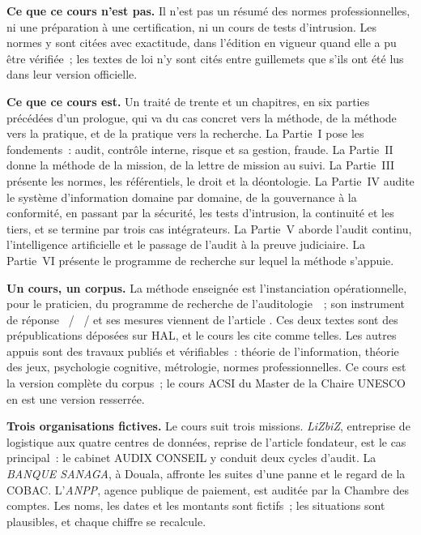 \textbf{Ce que ce cours n'est pas.} Il n'est pas un résumé des normes
professionnelles, ni une préparation à une certification, ni un cours de
tests d'intrusion. Les normes y sont citées avec exactitude, dans l'édition
en vigueur quand elle a pu être vérifiée~; les textes de loi n'y sont cités
entre guillemets que s'ils ont été lus dans leur version officielle.

\bigskip

\textbf{Ce que ce cours est.} Un traité de trente et un chapitres, en six
parties précédées d'un prologue, qui va du cas concret vers la méthode, de
la méthode vers la pratique, et de la pratique vers la recherche. La
Partie~I pose les fondements~: audit, contrôle interne, risque et sa
gestion, fraude. La Partie~II donne la méthode de la mission, de la lettre
de mission au suivi. La Partie~III présente les normes, les référentiels,
le droit et la déontologie. La Partie~IV audite le système d'information
domaine par domaine, de la gouvernance à la conformité, en passant par la
sécurité, les tests d'intrusion, la continuité et les tiers, et se termine
par trois cas intégrateurs. La Partie~V aborde l'audit continu,
l'intelligence artificielle et le passage de l'audit à la preuve
judiciaire. La Partie~VI présente le programme de recherche sur lequel la
méthode s'appuie.

\bigskip

\textbf{Un cours, un corpus.} La méthode enseignée est l'instanciation
opérationnelle, pour le praticien, du programme de recherche de
l'auditologie~\cite{minka2026auditologie}~; son instrument de réponse
\OUI{}~/ \NON{}~/ \NEK{} et ses mesures viennent de l'article
\cite{minka2026nek}. Ces deux textes sont des prépublications déposées sur
HAL, et le cours les cite comme telles. Les autres appuis sont des travaux
publiés et vérifiables~: théorie de l'information, théorie des jeux,
psychologie cognitive, métrologie, normes professionnelles. Ce cours est la
version complète du corpus~; le cours ACSI du Master de la Chaire UNESCO en
est une version resserrée.

\bigskip

\textbf{Trois organisations fictives.} Le cours suit trois missions.
\emph{LiZbiZ}, entreprise de logistique aux quatre centres de données,
reprise de l'article fondateur, est le cas principal~: le cabinet AUDIX
CONSEIL y conduit deux cycles d'audit. La \emph{BANQUE SANAGA}, à Douala,
affronte les suites d'une panne et le regard de la COBAC. L'\emph{ANPP},
agence publique de paiement, est auditée par la Chambre des comptes. Les
noms, les dates et les montants sont fictifs~; les situations sont
plausibles, et chaque chiffre se recalcule.

